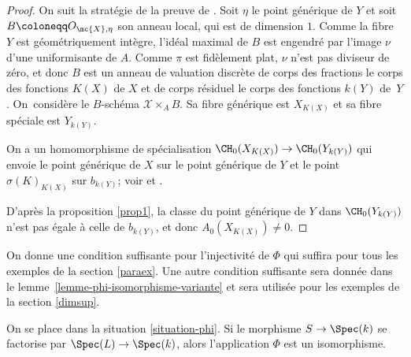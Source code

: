 \begin{proof}
On suit la stratégie de la preuve de \cite[Th.\,1.12]{colliot2016hypersurfaces}. Soit $\eta$ le point générique de $Y$ et soit $B\coloneqq O_{\mc{X},\eta}$ son anneau local, qui est de dimension $1$. Comme la fibre $Y$ est géométriquement intègre, l'idéal maximal de $B$ est engendré par l'image $\nu$ d'une uniformisante de $A$. Comme $\pi$ est fidèlement plat, $\nu$ n'est pas diviseur de zéro, et donc $B$ est un anneau de valuation discrète de corps des fractions le corps des fonctions $K(X)$ de $X$ et de corps résiduel le corps des fonctions $k(Y)$ de~$Y$. On~considère le $B$-schéma ${\mathcal X}\times_{A}B$. Sa fibre générique est $X_{K(X)}$ et sa fibre spéciale est $Y_{k(Y)}$.

On a un homomorphisme de spécialisation
$\CH_{0}(X_{K(X)}) \to \CH_{0}(Y_{k(Y)})$
qui envoie le point générique de $X$ sur le point générique de $Y$ et le point $\sigma(K)_{K(X)}$ sur $b_{k(Y)}$; voir \cite{fulton1975rational} et \cite[\S 20.3]{fulton1998intersection}.

D'après la proposition \ref{prop1}, la classe du point générique de $Y$
dans $\CH_{0}(Y_{k(Y)})$ n'est pas
égale à celle de $b_{k(Y)} $,
et donc $A_{0}(X_{K(X)}) \neq 0$.
\end{proof}

On donne une condition suffisante pour l'injectivité de $\Phi$ qui suffira pour tous les exemples de la section \ref{paraex}. Une autre condition suffisante sera donnée dans le lemme~\ref{lemme-phi-isomorphisme-variante} et sera utilisée pour les exemples de la section \ref{dimsup}.

\begin{lemma}\label{lemme-phi-isomorphisme}
On se place dans la situation \ref{situation-phi}. Si le morphisme $S \to \Spec(k)$ se factorise par $\Spec(L) \to \Spec(k)$, alors l'application $\Phi$ est un isomorphisme.
\end{lemma}

